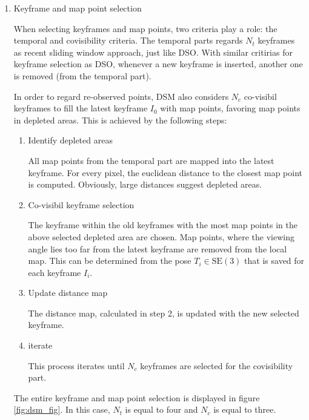 	\begin{enumerate}
	\item{Keyframe and map point selection}
	
	When selecting keyframes and map points, two criteria play a role: the temporal and covisibility criteria. 
	The temporal parts regards $N_t$ keyframes as recent sliding window approach, just like DSO. With similar 
	critirias for keyframe selection as DSO, whenever a new keyframe is inserted, another one is removed (from the temporal part).

	In order to regard re-observed points, DSM also considers $N_c$ co-visibil keyframes to fill the latest keyframe $I_0$ with map points, favoring 
	map points in depleted areas. This is achieved by the following steps: 
	
	\begin{enumerate}
	\item{Identify depleted areas}
	
	All map points from the temporal part are mapped into the latest keyframe. For every pixel, the euclidean distance to the closest map point 
	is computed. Obviously, large distances suggest depleted areas.
	
	\item{Co-visibil keyframe selection}
	
	The keyframe within the old keyframes with the most map points in the above selected depleted area are chosen. Map points, where the viewing angle 
	lies too far from the latest keyframe are removed from the local map. 
	This can be determined from the pose $T_i \in \text{SE}(3)$ that is saved for each keyframe $I_i$. 
	
	\item{Update distance map}
	
	The distance map, calculated in step 2, is updated with the new selected keyframe. 
	
	\item{iterate}
	
	This process iterates until $N_c$ keyframes are selected for the covisibility part. 
	
	\end{enumerate}
	
	The entire keyframe and map point selection is displayed in figure \ref{fig:dsm_fig}. In this case, $N_t$ is equal to four and $N_c$ is equal to three.
	
	

\end{enumerate}

